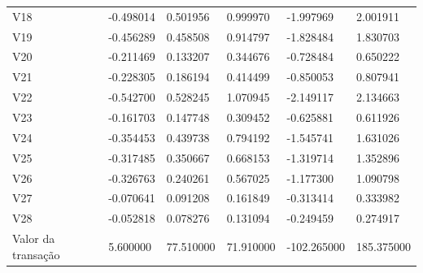 \begin{longtable}{llllll}
V18 & -0.498014 & 0.501956 & 0.999970 & -1.997969 & 2.001911 \\
V19 & -0.456289 & 0.458508 & 0.914797 & -1.828484 & 1.830703 \\
V20 & -0.211469 & 0.133207 & 0.344676 & -0.728484 & 0.650222 \\
V21 & -0.228305 & 0.186194 & 0.414499 & -0.850053 & 0.807941 \\
V22 & -0.542700 & 0.528245 & 1.070945 & -2.149117 & 2.134663 \\
V23 & -0.161703 & 0.147748 & 0.309452 & -0.625881 & 0.611926 \\
V24 & -0.354453 & 0.439738 & 0.794192 & -1.545741 & 1.631026 \\
V25 & -0.317485 & 0.350667 & 0.668153 & -1.319714 & 1.352896 \\
V26 & -0.326763 & 0.240261 & 0.567025 & -1.177300 & 1.090798 \\
V27 & -0.070641 & 0.091208 & 0.161849 & -0.313414 & 0.333982 \\
V28 & -0.052818 & 0.078276 & 0.131094 & -0.249459 & 0.274917 \\
Valor da transação & 5.600000 & 77.510000 & 71.910000 & -102.265000 & 185.375000 \\
\end{longtable}

